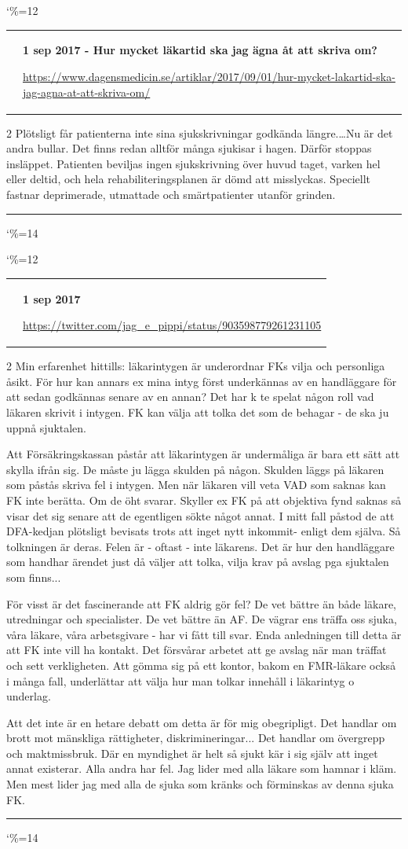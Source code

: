 \documentclass[a4paper]{article}
\makeatletter
\newcommand{\entry}{
\catcode`\%=12
\@entry}
\newcommand{\@entry}[3]{
\bigskip
\begin{tabular*}{\textwidth}{l m{\textwidth-4cm}}
\qrcode{#3} & \textbf{#1}

\medskip

\url{#3}

\end{tabular*}

\medskip


\begin{multicols}{2}
#2
\end{multicols}

\medskip
\hrule

\catcode`\%=14
}
\makeatother
\begin{document}
\entry{1 sep 2017 - Hur mycket läkartid ska jag ägna åt att skriva om?}{Plötsligt får patienterna inte sina sjukskrivningar godkända längre.\ldots Nu är det andra bullar. Det finns redan alltför många sjukisar i hagen. Därför stoppas insläppet. Patienten beviljas ingen sjukskrivning över huvud taget, varken hel eller deltid, och hela rehabiliterings­planen är dömd att misslyckas. Speciellt fastnar deprimerade, utmattade och smärt­patienter utanför grinden. }{https://www.dagensmedicin.se/artiklar/2017/09/01/hur-mycket-lakartid-ska-jag-agna-at-att-skriva-om/}

\entry{1 sep 2017}{Min erfarenhet hittills: läkarintygen är underordnar FKs vilja och personliga åsikt.
 För hur kan annars ex mina intyg först underkännas av en handläggare för att sedan godkännas senare av en annan?
Det har k te spelat någon roll vad läkaren skrivit i intygen. FK kan välja att tolka det som de behagar - de ska ju uppnå sjuktalen.

Att Försäkringskassan påstår att läkarintygen är undermåliga är bara ett sätt att skylla ifrån sig. De måste ju lägga skulden på någon.
Skulden läggs på läkaren som påstås skriva fel i intygen. Men när läkaren vill veta VAD som saknas kan FK inte berätta. Om de öht svarar.
Skyller ex FK på att objektiva fynd saknas så visar det sig senare att de egentligen sökte något annat. I mitt fall påstod de att DFA-kedjan
plötsligt bevisats trots att inget nytt inkommit- enligt dem själva. Så tolkningen är deras. Felen är - oftast - inte läkarens.
Det är hur den handläggare som handhar ärendet just då väljer att tolka, vilja krav på avslag pga sjuktalen som finns...

För visst är det fascinerande att FK aldrig gör fel? De vet bättre än både läkare, utredningar och specialister. De vet bättre än AF.
De vägrar ens träffa oss sjuka, våra läkare, våra arbetsgivare - \say{det ingår inte i mina arbetsuppgifter} har vi fått till svar.
Enda anledningen till detta är att FK inte vill ha kontakt. Det försvårar arbetet att ge avslag när man träffat och sett verkligheten.
Att gömma sig på ett kontor, bakom en FMR-läkare också i många fall, underlättar att välja hur man tolkar innehåll i läkarintyg o underlag.

Att det inte är en hetare debatt om detta är för mig obegripligt. Det handlar om brott mot mänskliga rättigheter, diskrimineringar...
Det handlar om övergrepp och maktmissbruk. Där en myndighet är helt så sjukt kär i sig själv att inget annat existerar. Alla andra har fel.
Jag lider med alla läkare som hamnar i kläm. Men mest lider jag med alla de sjuka som kränks och förminskas av denna sjuka FK.
}{https://twitter.com/jag_e_pippi/status/903598779261231105}
\end{document}
